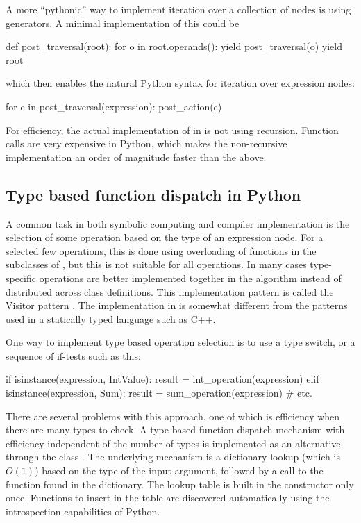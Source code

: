 A more ``pythonic'' way to implement iteration over a collection of
nodes is using generators.  A minimal implementation of this could be
\begin{python}
def post_traversal(root):
    for o in root.operands():
        yield post_traversal(o)
    yield root
\end{python}
which then enables the natural Python syntax for iteration over expression
nodes:
\begin{python}
for e in post_traversal(expression):
    post_action(e)
\end{python}
For efficiency, the actual implementation of 
in \ufl{} is not using recursion.  Function calls are very expensive
in Python, which makes the non-recursive implementation an order of
magnitude faster than the above.

\subsection{Type based function dispatch in Python}
\label{ufl:sec:multifunction}

A common task in both symbolic computing and compiler implementation
is the selection of some operation based on the type of an expression
node.  For a selected few operations, this is done using overloading
of functions in the subclasses of , but this is not suitable
for all operations.  In many cases type-specific operations are better
implemented together in the algorithm instead of distributed across
class definitions.  This implementation pattern is called the Visitor
pattern \citep{GammaHelmJohnsonEtAl1995}.  The implementation in \ufl{}
is somewhat different from the patterns used in a statically typed
language such as C++.

One way to implement type based operation selection is to use a type
switch, or a sequence of if-tests such as this:
\begin{python}
if isinstance(expression, IntValue):
    result = int_operation(expression)
elif isinstance(expression, Sum):
    result = sum_operation(expression)
# etc.
\end{python}
There are several problems with this approach, one of which is
efficiency when there are many types to check.  A type based function
dispatch mechanism with efficiency independent of the number of types
is implemented as an alternative through the class .
The underlying mechanism is a dictionary lookup (which is $O(1)$) based on
the type of the input argument, followed by a call to the function found
in the dictionary. The lookup table is built in the 
constructor only once.  Functions to insert in the table are discovered
automatically using the introspection capabilities of Python.

